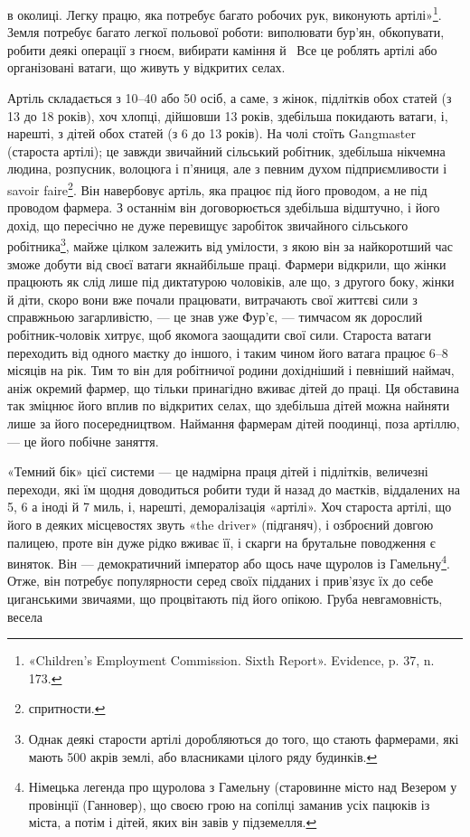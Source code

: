 \parcont{}  %
в околиці. Легку працю, яка потребує багато робочих рук, виконують
артілі»\footnote{
«Children's Employment Commission. Sixth Report». Evidence,
p. 37, n. 173.
}. Земля потребує багато легкої польової роботи:
виполювати бур’ян, обкопувати, робити деякі операції з
гноєм, вибирати каміння й~ Все це роблять артілі або організовані
ватаги, що живуть у відкритих селах.

Артіль складається з 10--40 або 50 осіб, а саме, з жінок,
підлітків обох статей (з 13 до 18 років), хоч хлопці, дійшовши
13 років, здебільша покидають ватаги, і, нарешті, з дітей обох
статей (з 6 до 13 років). На чолі стоїть Gangmaster (староста
артілі); це завжди звичайний сільський робітник, здебільша
нікчемна людина, розпусник, волоцюга і п’яниця, але з певним
духом підприємливости і savoir faire\footnote*{
спритности. 
}. Він навербовує артіль,
яка працює під його проводом, а не під проводом фармера. З останнім
він договорюється здебільша відштучно, і його дохід, що
пересічно не дуже перевищує заробіток звичайного сільського
робітника\footnote{
Однак деякі старости артілі доробляються до того, що стають
фармерами, які мають 500 акрів землі, або власниками цілого ряду будинків.
}, майже цілком залежить від умілости, з якою він
за найкоротший час зможе добути від своєї ватаги якнайбільше
праці. Фармери відкрили, що жінки працюють як слід лише під
диктатурою чоловіків, але що, з другого боку, жінки й діти,
скоро вони вже почали працювати, витрачають свої життєві
сили з справжньою загарливістю, — це знав уже Фур’є, — тимчасом
як дорослий робітник-чоловік хитрує, щоб якомога заощадити
свої сили. Староста ватаги переходить від одного маєтку
до іншого, і таким чином його ватага працює 6--8 місяців на
рік. Тим то він для робітничої родини дохідніший і певніший
наймач, аніж окремий фармер, що тільки принагідно вживає
дітей до праці. Ця обставина так зміцнює його вплив по відкритих
селах, що здебільша дітей можна найняти лише за його посередництвом.
Наймання фармерам дітей поодинці, поза артіллю, —
це його побічне заняття.

«Темний бік» цієї системи — це надмірна праця дітей і підлітків,
величезні переходи, які їм щодня доводиться робити туди
й назад до маєтків, віддалених на 5, 6 а іноді й 7 миль, і, нарешті,
деморалізація «артілі». Хоч староста артілі, що його в деяких
місцевостях звуть «the driver» (підганяч), і озброєний довгою
палицею, проте він дуже рідко вживає її, і скарги на брутальне
поводження є виняток. Він — демократичний імператор або щось
наче щуролов із Гамельну\footnote*{
Німецька легенда про щуролова з Гамельну (старовинне місто
над Везером у провінції (Ганновер), що своєю грою на сопілці заманив
усіх пацюків із міста, а потім і дітей, яких він завів у підземелля. 
}. Отже, він потребує популярности
серед своїх підданих і прив’язує їх до себе циганськими звичаями,
що процвітають під його опікою. Груба невгамовність, весела
\parbreak{}  %
